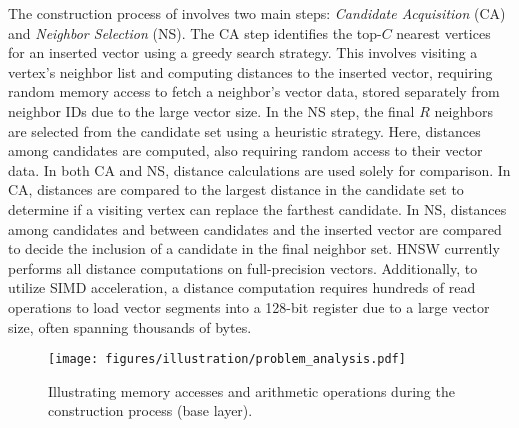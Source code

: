 The construction process of  involves two main steps: \textit{Candidate Acquisition} (CA) and \textit{Neighbor Selection} (NS). The CA step identifies the top-$C$ nearest vertices for an inserted vector using a greedy search strategy. This involves visiting a vertex's neighbor list and computing distances to the inserted vector, requiring random memory access to fetch a neighbor's vector data, stored separately from neighbor IDs due to the large vector size. In the NS step, the final $R$ neighbors are selected from the candidate set using a heuristic strategy. Here, distances among candidates are computed, also requiring random access to their vector data. In both CA and NS, distance calculations are used solely for comparison. In CA, distances are compared to the largest distance in the candidate set to determine if a visiting vertex can replace the farthest candidate. In NS, distances among candidates and between candidates and the inserted vector are compared to decide the inclusion of a candidate in the final neighbor set. HNSW currently performs all distance computations on full-precision vectors. Additionally, to utilize SIMD acceleration, a distance computation requires hundreds of read operations to load vector segments into a 128-bit register due to a large vector size, often spanning thousands of bytes.

\begin{figure}
  \centering
  \setlength{\abovecaptionskip}{0.1cm}
  \setlength{\belowcaptionskip}{0.1cm}
  \texttt{[image: figures/illustration/problem\_analysis.pdf]}
  \caption{Illustrating memory accesses and arithmetic operations during the  construction process (base layer).}
  \label{fig:problem ananlysis}
\end{figure}

